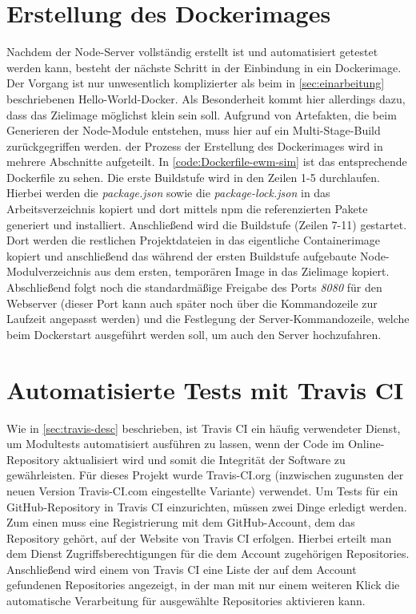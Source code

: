 \section{Erstellung des Dockerimages}
Nachdem der Node-Server vollständig erstellt ist und automatisiert getestet werden kann, besteht der nächste Schritt in der Einbindung in ein Dockerimage.
Der Vorgang ist nur unwesentlich komplizierter als beim in \autoref{sec:einarbeitung} beschriebenen Hello-World-Docker.
Als Besonderheit kommt hier allerdings dazu, dass das Zielimage möglichst klein sein soll.
Aufgrund von Artefakten, die beim Generieren der Node-Module entstehen, muss hier auf ein Multi-Stage-Build zurückgegriffen werden.
\Dash der Prozess der Erstellung des Dockerimages wird in mehrere Abschnitte aufgeteilt.
In \autoref{code:Dockerfile-ewm-sim} ist das entsprechende Dockerfile zu sehen.
Die erste Buildstufe wird in den Zeilen 1-5 durchlaufen.
Hierbei werden die \emph{package.json} sowie die \emph{package-lock.json} in das Arbeitsverzeichnis kopiert und dort mittels \ac{npm} die referenzierten Pakete generiert und installiert.
Anschließend wird die Buildstufe (Zeilen 7-11) gestartet.
Dort werden die restlichen Projektdateien in das eigentliche Containerimage kopiert und anschließend das während der ersten Buildstufe aufgebaute Node-Modulverzeichnis aus dem ersten, temporären Image in das Zielimage kopiert.
Abschließend folgt noch die standardmäßige Freigabe des Ports \emph{8080} für den Webserver (dieser Port kann auch später noch über die Kommandozeile zur Laufzeit angepasst werden) und die Festlegung der Server-Kommandozeile, welche beim Dockerstart ausgeführt werden soll, um auch den Server hochzufahren.




\section{Automatisierte Tests mit Travis CI}
Wie in \autoref{sec:travis-desc} beschrieben, ist Travis CI ein häufig verwendeter Dienst, um Modultests automatisiert ausführen zu lassen, wenn der Code im Online-Repository aktualisiert wird und somit die Integrität der Software zu gewährleisten.
Für dieses Projekt wurde Travis-CI.org (inzwischen zugunsten der neuen Version Travis-CI.com eingestellte Variante) verwendet.
Um Tests für ein GitHub-Repository in Travis CI einzurichten, müssen zwei Dinge erledigt werden.
Zum einen muss eine Registrierung mit dem GitHub-Account, dem das Repository gehört, auf der Website von Travis CI erfolgen.
Hierbei erteilt man dem Dienst Zugriffsberechtigungen für die dem Account zugehörigen Repositories.
Anschließend wird einem von Travis CI eine Liste der auf dem Account gefundenen Repositories angezeigt, in der man mit nur einem weiteren Klick die automatische Verarbeitung für ausgewählte Repositories aktivieren kann.

